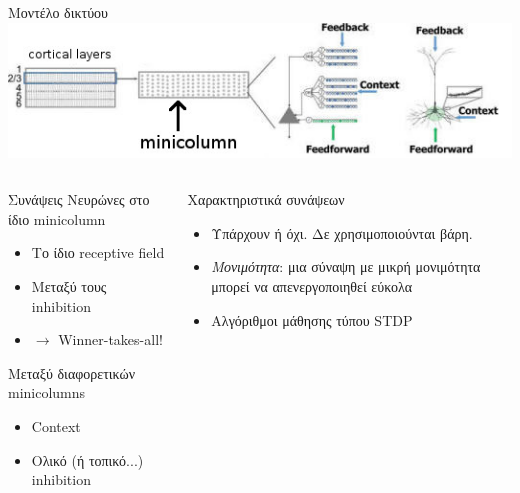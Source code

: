\documentclass[11pt,center]{beamer}
\begin{document}
\begin{frame}{Μοντέλο δικτύου}
  \centering
  \includegraphics[width=.8\textwidth]{../pics/minicolumn}

  \vspace{-0.5em}
  \small{
    \begin{columns}
      \begin{block}{Συνάψεις}
        Νευρώνες στο ίδιο minicolumn
        \vspace{-0.5em}
        \begin{itemize}
          \item Tο ίδιο receptive field
          \item Μεταξύ τους inhibition
          \item[] $\rightarrow$ Winner-takes-all!
        \end{itemize}

        \vspace{-0.5em}
        Μεταξύ διαφορετικών minicolumns
        \vspace{-0.5em}
        \begin{itemize}
          \item Context
          \item Ολικό (ή τοπικό...) inhibition
        \end{itemize}
      \end{block}

      \begin{block}{Χαρακτηριστικά συνάψεων}
        \vspace{-0.5em}
        \begin{itemize}
          \item \alert{Υπάρχουν ή όχι}. Δε χρησιμοποιούνται βάρη.
          \item \emph{Μονιμότητα}: μια σύναψη με μικρή μονιμότητα μπορεί να απενεργοποιηθεί εύκολα
          \item Αλγόριθμοι μάθησης τύπου STDP
        \end{itemize}
      \end{block}
    \end{columns}
  }
\end{frame}
\end{document}
